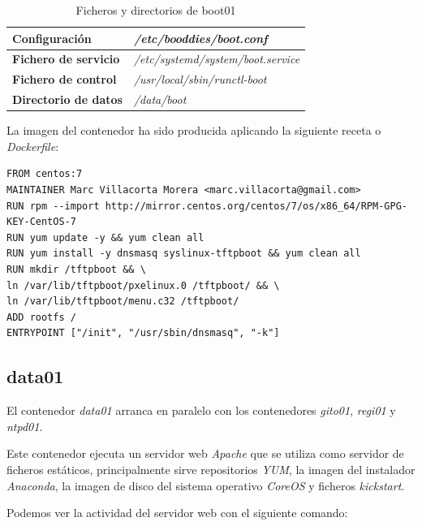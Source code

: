 \documentclass[a4paper,12pt,spanish,final]{epsc_tfc_pfc}
\begin{document}
\begin{table}[h]

  \centering

  \begin{tabular}{ll}
    \toprule
    \textbf{Configuración}        & \textit{/etc/booddies/boot.conf}          \\
    \midrule
    \rowcolor[HTML]{EFEFEF}
    \textbf{Fichero de servicio}  & \textit{/etc/systemd/system/boot.service} \\
    \midrule
    \textbf{Fichero de control}   & \textit{/usr/local/sbin/runctl-boot}      \\
    \midrule
    \rowcolor[HTML]{EFEFEF}
    \textbf{Directorio de datos}  & \textit{/data/boot}                       \\
    \bottomrule
  \end{tabular}

  \caption{Ficheros y directorios de boot01}

\end{table}

La imagen del contenedor ha sido producida aplicando la siguiente receta o \emph{Dockerfile}:\\

\begin{lstlisting}[style=dnsmasq]
FROM centos:7
MAINTAINER Marc Villacorta Morera <marc.villacorta@gmail.com>
RUN rpm --import http://mirror.centos.org/centos/7/os/x86_64/RPM-GPG-KEY-CentOS-7
RUN yum update -y && yum clean all
RUN yum install -y dnsmasq syslinux-tftpboot && yum clean all
RUN mkdir /tftpboot && \
ln /var/lib/tftpboot/pxelinux.0 /tftpboot/ && \
ln /var/lib/tftpboot/menu.c32 /tftpboot/
ADD rootfs /
ENTRYPOINT ["/init", "/usr/sbin/dnsmasq", "-k"]
\end{lstlisting}

\subsection{data01}

El contenedor \emph{data01} arranca en paralelo con los contenedores \emph{gito01}, \emph{regi01} y \emph{ntpd01}.

Este contenedor ejecuta un servidor web \emph{Apache} que se utiliza como servidor de ficheros estáticos, principalmente sirve repositorios \emph{YUM}, la imagen del instalador \emph{Anaconda}, la imagen de disco del sistema operativo \emph{CoreOS} y ficheros \emph{kickstart}.

Podemos ver la actividad del servidor web con el siguiente comando:\\
\end{document}
